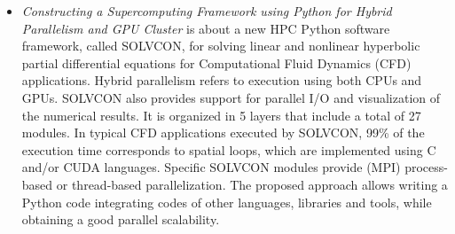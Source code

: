\begin{itemize}
\item \textit {Constructing a Supercomputing Framework using Python for Hybrid Parallelism and GPU Cluster} \cite {Chen2011} is about a new HPC Python software framework, called SOLVCON, for solving linear and nonlinear hyperbolic partial differential equations for Computational Fluid Dynamics (CFD) applications. Hybrid parallelism refers to execution using both CPUs and GPUs. SOLVCON also provides support for parallel I/O and visualization of the numerical results. It is organized in 5 layers that include a total of 27 modules. In typical CFD applications executed by SOLVCON, 99\% of the execution time corresponds to spatial loops, which are implemented using C and/or CUDA languages. Specific SOLVCON modules provide (MPI) process-based or thread-based parallelization. The proposed approach allows writing a Python code integrating codes of other languages, libraries and tools, while obtaining a good parallel scalability. 

\end{itemize}
